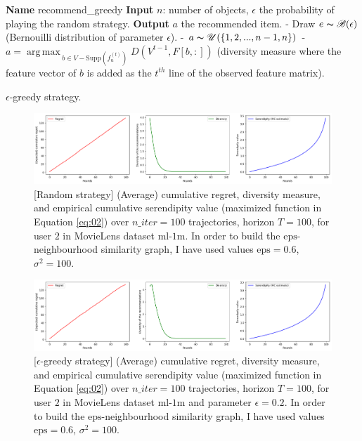 \documentclass{article}
\DeclareMathOperator*{\argmax}{arg\,max\,}
\begin{document}
\begin{algorithm}
\begin{algorithmic}
\STATE \textbf{Name} recommend\_greedy
\STATE \textbf{Input} $n$: number of objects, $\epsilon$ the probability of playing the random strategy.
\STATE \textbf{Output} $a$ the recommended item.
\STATE - Draw $e \thicksim \mathscr{B}(\epsilon)$ (Bernouilli distribution of parameter $\epsilon$).
\STATE - $a \thicksim \mathscr{U}(\{1, 2, ..., n-1, n\})$
\ELSE
\STATE - $a = \argmax_{b \in V-\text{Supp}(f^{(t)}_{u})} D(V^{t-1}, F[b, :])$ (diversity measure where the feature vector of $b$ is added as the $t^{th}$ line of the observed feature matrix).
\ENDIF
\end{algorithmic}
\caption{$\epsilon$-greedy strategy.}
\label{greedy}
\end{algorithm}

\begin{figure}[H]
  \centering
  \includegraphics[scale=0.4]{../Results/ml-1m/random-32sec.png}
  \caption{[Random strategy] (Average) cumulative regret, diversity measure, and empirical cumulative serendipity value (maximized function in Equation \ref{eq:02}) over $n\_iter=100$ trajectories, horizon $T=100$, for user $2$ in MovieLens dataset $\text{ml-1m}$. In order to build the $\text{eps}$-neighbourhood similarity graph, I have used values $\text{eps}=0.6$, $\sigma^{2}=100$.}
\label{figrandom}
\end{figure}

\begin{figure}[H]
  \centering
  \includegraphics[scale=0.4]{../Results/ml-1m/greedy-1min30sec.png}
  \caption{[$\epsilon$-greedy strategy] (Average) cumulative regret, diversity measure, and empirical cumulative serendipity value (maximized function in Equation \ref{eq:02}) over $n\_iter=100$ trajectories, horizon $T=100$, for user $2$ in MovieLens dataset $\text{ml-1m}$ and parameter $\epsilon=0.2$. In order to build the $\text{eps}$-neighbourhood similarity graph, I have used values $\text{eps}=0.6$, $\sigma^{2}=100$.}
\label{figgreedy}
\end{figure}
\end{document}
